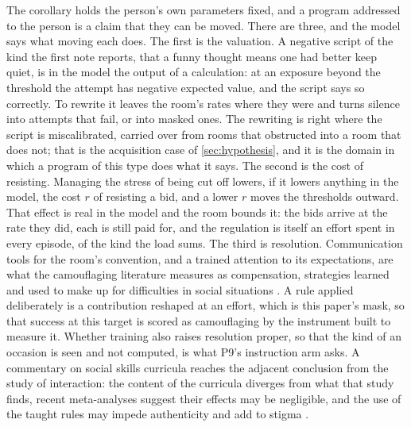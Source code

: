 The corollary holds the person's own parameters fixed, and a program addressed to the person is a claim that they can be moved. There are three, and the model says what moving each does. The first is the valuation. A negative script of the kind the first note reports, that a funny thought means one had better keep quiet, is in the model the output of a calculation: at an exposure beyond the threshold the attempt has negative expected value, and the script says so correctly. To rewrite it leaves the room's rates where they were and turns silence into attempts that fail, or into masked ones. The rewriting is right where the script is miscalibrated, carried over from rooms that obstructed into a room that does not; that is the acquisition case of \autoref{sec:hypothesis}, and it is the domain in which a program of this type does what it says. The second is the cost of resisting. Managing the stress of being cut off lowers, if it lowers anything in the model, the cost $r$ of resisting a bid, and a lower $r$ moves the thresholds outward. That effect is real in the model and the room bounds it: the bids arrive at the rate they did, each is still paid for, and the regulation is itself an effort spent in every episode, of the kind the load sums. The third is resolution. Communication tools for the room's convention, and a trained attention to its expectations, are what the camouflaging literature measures as compensation, strategies learned and used to make up for difficulties in social situations \cite{Hull2019, Livingston2019}. A rule applied deliberately is a contribution reshaped at an effort, which is this paper's mask, so that success at this target is scored as camouflaging by the instrument built to measure it. Whether training also raises resolution proper, so that the kind of an occasion is seen and not computed, is what P9's instruction arm asks. A commentary on social skills curricula reaches the adjacent conclusion from the study of interaction: the content of the curricula diverges from what that study finds, recent meta-analyses suggest their effects may be negligible, and the use of the taught rules may impede authenticity and add to stigma \cite{BottemaBeutel2018}.

